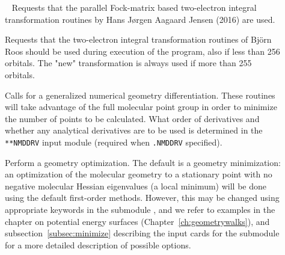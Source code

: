 \begin{description}
\item[]\verb| |\newline
{} Requests that the parallel
Fock-matrix based two-electron integral transformation routines
by Hans J\o rgen Aagaard Jensen (2016) are used.

\item[] Requests that the
two-electron integral transformation routines of Bj\"{o}rn Roos
should be used during execution of the program, also if less than
256 orbitals. The "new" transformation is always used if more than 255 orbitals.

\item[] Calls for a generalized numerical geometry
differentiation. These routines will take advantage of the full
molecular point group in order to minimize the number of points to be
calculated. What order of derivatives and whether any analytical
derivatives are to be used is determined in the \verb|**NMDDRV| input
module (required when \texttt{.NMDDRV} specified).

\item[] Perform a geometry optimization.
The default is a geometry minimization:
an optimization of the molecular geometry to a stationary point with no
negative molecular Hessian eigenvalues
(a local minimum) will be done using the default first-order
methods. However, this may be changed using appropriate
keywords in the submodule , and we refer to examples in
the chapter on potential energy surfaces
(Chapter~\ref{ch:geometrywalks}), and subsection~\ref{subsec:minimize}
describing the input cards for the  submodule for a more
detailed description of possible options.



\end{description}
